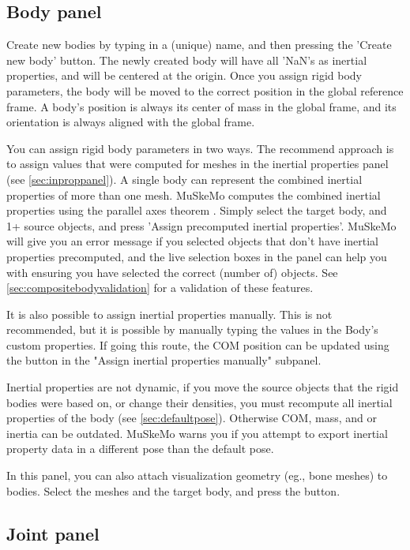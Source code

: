 \documentclass{article}
\begin{document}
\subsection{Body panel}
\label{sec:bodypanel}

Create new bodies by typing in a (unique) name, and then pressing the 'Create new body' button. The newly created body will have all 'NaN's as inertial properties, and will be centered at the origin. Once you assign rigid body parameters, the body will be moved to the correct position in the global reference frame. A body's position is always its center of mass in the global frame, and its orientation is always aligned with the global frame.

You can assign rigid body parameters in two ways. The recommend approach is to assign values that were computed for meshes in the inertial properties panel (see \ref{sec:inproppanel}). A single body can represent the combined inertial properties of more than one mesh. MuSkeMo computes the combined inertial properties using the parallel axes theorem \cite{valleryAdvancedDynamics2019,ruinaMechanicsToolsetStatics2019}. Simply select the target body, and 1+ source objects, and press 'Assign precomputed inertial properties'. MuSkeMo will give you an error message if you selected objects that don't have inertial properties precomputed, and the live selection boxes in the panel can help you with ensuring you have selected the correct (number of) objects. See \ref{sec:compositebodyvalidation} for a validation of these features.

It is also possible to assign inertial properties manually. This is not recommended, but it is possible by manually typing the values in the Body's custom properties. If going this route, the COM position can be updated using the button in the "Assign inertial properties manually" subpanel.

Inertial properties are not dynamic, if you move the source objects that the rigid bodies were based on, or change their densities, you must recompute all inertial properties of the body (see \ref{sec:defaultpose}). Otherwise COM, mass, and or inertia can be outdated. MuSkeMo warns you if you attempt to export inertial property data in a different pose than the default pose.

In this panel, you can also attach visualization geometry (eg., bone meshes) to bodies. Select the meshes and the target body, and press the button.

\subsection{Joint panel}
\label{sec:jointpanel}
\end{document}
